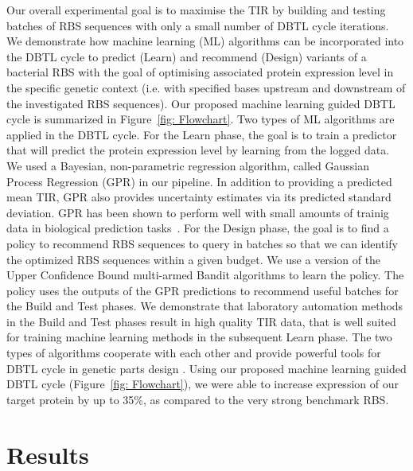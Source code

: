 \documentclass{article}
\newcommand{\maciej}[1]{\textcolor{blue}{#1}}
\begin{document}
Our overall experimental goal is to maximise the TIR by building and testing batches of RBS sequences with only a small number of DBTL cycle iterations.
We demonstrate how machine learning (ML) algorithms can be incorporated
into the DBTL cycle to predict (Learn) and recommend (Design) variants
of a bacterial RBS with the goal of optimising associated protein expression
level in the specific genetic context
(i.e. with specified bases upstream and downstream of the investigated RBS sequences).
Our proposed machine learning guided DBTL cycle is summarized in Figure~\ref{fig: Flowchart}.
Two types of ML algorithms are applied in the DBTL cycle.
For the Learn phase, the goal is to train a predictor that will predict the protein expression level by learning from the logged data.
We used a Bayesian, non-parametric regression algorithm, called
Gaussian Process Regression (GPR) \cite{Rasmussen2004} in our pipeline.
In addition to providing a predicted mean TIR, GPR also provides
uncertainty estimates via its predicted standard deviation.
GPR has been shown to  perform well with small amounts of trainig data in
biological prediction tasks~\cite{Rasmussen2004, desautels2014parallelizing}.
For the Design phase, the goal is to find a policy to recommend RBS sequences
to query in batches so that we can identify the optimized RBS sequences
within a given budget.
We use a version of the Upper Confidence Bound multi-armed Bandit algorithms \cite{desautels2014parallelizing} to learn the policy.
The policy uses the outputs of the GPR predictions to recommend useful batches for the Build and Test phases.
We demonstrate that laboratory automation methods in the Build and Test phases
result in high quality TIR data, that is well suited for training
machine learning methods in the subsequent Learn phase.
The two types of algorithms cooperate with each other and provide powerful tools for DBTL cycle in genetic parts design \cite{srinivas2012information, desautels2014parallelizing}.
Using our proposed machine learning guided DBTL cycle
(Figure~\ref{fig: Flowchart}), we were able to increase expression of our
target protein by up to 35\%, as compared to the very strong benchmark RBS. \\


\section{Results}
\end{document}
